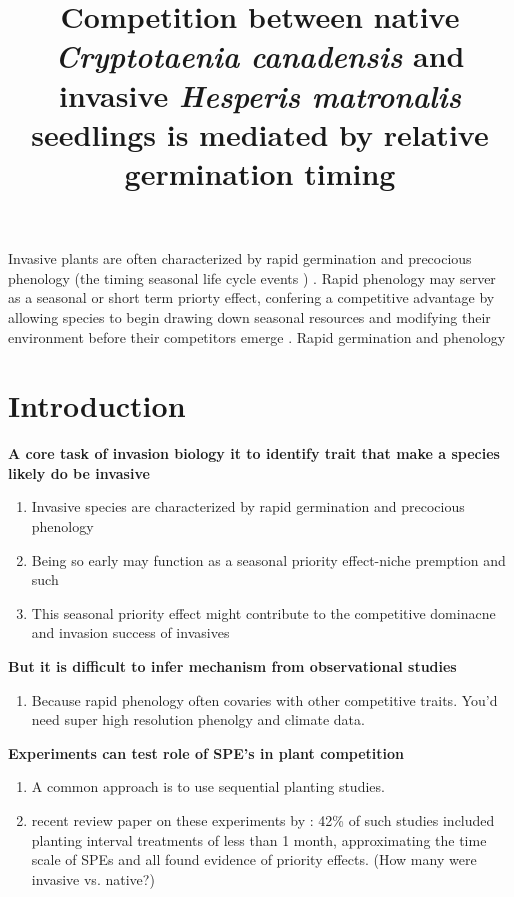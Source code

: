\documentclass{article}\usepackage[]{graphicx}\usepackage[]{color}
\title{Competition between native \textit{Cryptotaenia canadensis} and invasive \textit{Hesperis matronalis} seedlings is mediated by relative germination timing}
\begin{document}
\maketitle
Invasive plants are often characterized by rapid germination and precocious phenology (the timing seasonal life cycle events ) \citep{wolkovich, and other, and other}. Rapid phenology may server as a seasonal or short term priorty effect, confering a competitive advantage by allowing species to begin drawing down seasonal resources and modifying their environment before their competitors emerge \citep{}. Rapid germination and phenology

\section{Introduction}
\textbf{A core task of invasion biology it to identify trait that make a species likely do be invasive}
\begin{enumerate}
\item Invasive species are characterized by rapid germination and precocious phenology
\item Being so early may function as a seasonal priority effect-niche premption and such
\item This seasonal priority effect might contribute to the competitive dominacne and invasion success of invasives
\end{enumerate}

\textbf{But it is difficult to infer mechanism from observational studies}
\begin{enumerate}
\item Because rapid phenology often covaries with other competitive traits. You'd need super high resolution phenolgy and climate data.
\end{enumerate}

\textbf{Experiments can test role of SPE's in plant competition}
\begin{enumerate}
\item  A common approach is to use sequential planting studies.
\item recent review paper on these experiments by \citet{Weidlich:2020aa}: 42\% of such studies included planting interval treatments of less than 1 month, approximating the time scale of SPEs and all found evidence of priority effects. (How many were invasive vs. native?)
\end{enumerate}
\end{document}

